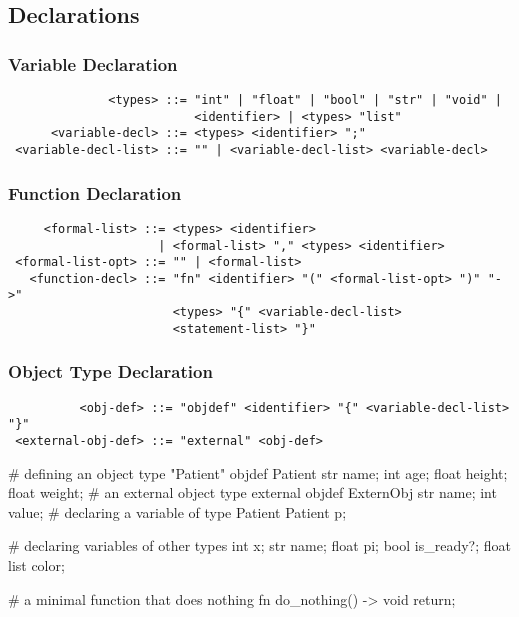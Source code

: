 \subsection{Declarations}

\subsubsection{Variable Declaration}

\begin{verbatim}
              <types> ::= "int" | "float" | "bool" | "str" | "void" |
                          <identifier> | <types> "list"
      <variable-decl> ::= <types> <identifier> ";"
 <variable-decl-list> ::= "" | <variable-decl-list> <variable-decl>
\end{verbatim}

\subsubsection{Function Declaration}

\begin{verbatim}
     <formal-list> ::= <types> <identifier>
                     | <formal-list> "," <types> <identifier>
 <formal-list-opt> ::= "" | <formal-list>
   <function-decl> ::= "fn" <identifier> "(" <formal-list-opt> ")" "->"
                       <types> "{" <variable-decl-list>
                       <statement-list> "}"
\end{verbatim}

\subsubsection{Object Type Declaration}

\begin{verbatim}
          <obj-def> ::= "objdef" <identifier> "{" <variable-decl-list> "}"
 <external-obj-def> ::= "external" <obj-def>
\end{verbatim}

\begin{mylistingn}
# defining an object type "Patient"
objdef Patient
{
  str   name;
  int   age;
  float height;
  float weight;
}
# an external object type
external objdef ExternObj
{
  str name;
  int value;
}
# declaring a variable of type Patient
Patient p;

# declaring variables of other types
int x;
str name;
float pi;
bool is_ready?;
float list color;

# a minimal function that does nothing
fn do_nothing() -> void
{
  return;
}
\end{mylistingn}

